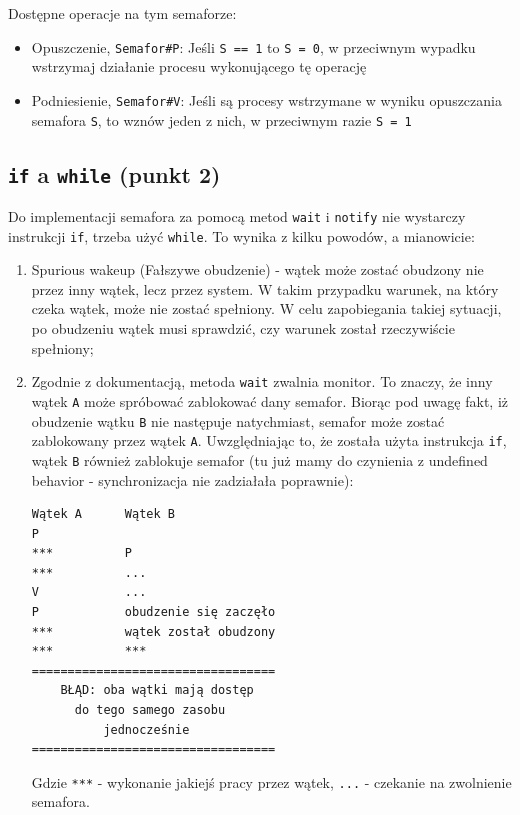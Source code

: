 \documentclass[11pt]{article}
\providecommand{\tightlist}{%
      \setlength{\itemsep}{0pt}\setlength{\parskip}{0pt}}
\begin{document}
Dostępne operacje na tym semaforze:

\begin{itemize}
\tightlist
\item
  Opuszczenie, \texttt{Semafor\#P}: Jeśli \texttt{S\ ==\ 1} to
  \texttt{S\ =\ 0}, w przeciwnym wypadku wstrzymaj działanie procesu
  wykonującego tę operację
\item
  Podniesienie, \texttt{Semafor\#V}: Jeśli są procesy wstrzymane w
  wyniku opuszczania semafora \texttt{S}, to wznów jeden z nich, w
  przeciwnym razie \texttt{S\ =\ 1}
\end{itemize}

    \hypertarget{if-a-while-punkt-2}{%
\subsection{\texorpdfstring{\texttt{if} a \texttt{while} (punkt
2)}{if a while (punkt 2)}}\label{if-a-while-punkt-2}}

Do implementacji semafora za pomocą metod \texttt{wait} i
\texttt{notify} nie wystarczy instrukcji \texttt{if}, trzeba użyć
\texttt{while}. To wynika z kilku powodów, a mianowicie:

\begin{enumerate}
\def\labelenumi{\arabic{enumi}.}
\item
  Spurious wakeup (Fałszywe obudzenie) - wątek może zostać obudzony nie
  przez inny wątek, lecz przez system. W takim przypadku warunek, na
  który czeka wątek, może nie zostać spełniony. W celu zapobiegania
  takiej sytuacji, po obudzeniu wątek musi sprawdzić, czy warunek został
  rzeczywiście spełniony;
\item
  Zgodnie z dokumentacją, metoda \texttt{wait} zwalnia monitor. To
  znaczy, że inny wątek \texttt{A} może spróbować zablokować dany
  semafor. Biorąc pod uwagę fakt, iż obudzenie wątku \texttt{B} nie
  następuje natychmiast, semafor może zostać zablokowany przez wątek
  \texttt{A}. Uwzględniając to, że została użyta instrukcja \texttt{if},
  wątek \texttt{B} również zablokuje semafor (tu już mamy do czynienia z
  undefined behavior - synchronizacja nie zadziałała poprawnie):

\begin{verbatim}
Wątek A      Wątek B
P
***          P
***          ...
V            ...
P            obudzenie się zaczęło
***          wątek został obudzony
***          ***
==================================
    BŁĄD: oba wątki mają dostęp
      do tego samego zasobu
          jednocześnie
==================================
\end{verbatim}

  Gdzie \texttt{***} - wykonanie jakiejś pracy przez wątek, \texttt{...}
  - czekanie na zwolnienie semafora.
\end{enumerate}
\end{document}
